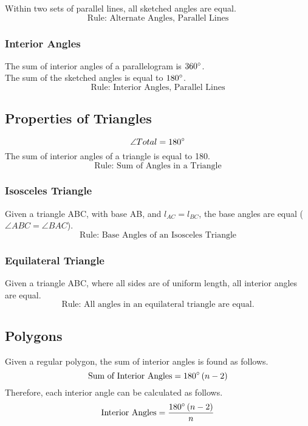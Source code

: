 \documentclass{report}
\begin{document}
\begin{flushleft}
Within two sets of parallel lines, all sketched angles are equal.
\[
\text{Rule: Alternate Angles, Parallel Lines}
\]

\subsubsection{Interior Angles}
\begin{center}
\end{center}

The sum of interior angles of a parallelogram is $360\degree$.\\
The sum of the sketched angles is equal to $180\degree$.
\[
\text{Rule: Interior Angles, Parallel Lines}
\]

\subsection{Properties of Triangles}
\begin{equation}
\angle Total = 180 \degree
\end{equation}
The sum of interior angles of a triangle is equal to 180\degree.
\[
\text{Rule: Sum of Angles in a Triangle}
\]
\subsubsection{Isosceles Triangle}
Given a triangle ABC, with base AB, and $l_{AC}=l_{BC}$, the base angles are equal ($\angle ABC = \angle BAC$).
\[
\text{Rule: Base Angles of an Isosceles Triangle}
\]
\subsubsection{Equilateral Triangle}
Given a triangle ABC, where all sides are of uniform length, all interior angles are equal.
\[
\text{Rule: All angles in an equilateral triangle are equal.}
\]

\subsection{Polygons}
Given a regular polygon, the sum of interior angles is found as follows.
\begin{equation}
\text{Sum of Interior Angles}=180\degree\left(n-2\right)
\end{equation}
Therefore, each interior angle can be calculated as follows.
\begin{equation}
\text{Interior Angles}=\frac{180\degree\left(n-2\right)}{n}
\end{equation}



\end{flushleft}
\end{document}

